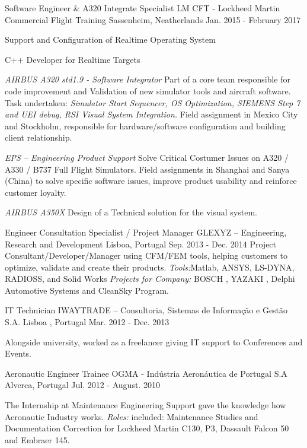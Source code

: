 \begin{cventries}
  \cventry
    {Software Engineer \& A320 Integrate Specialist}
    {LM CFT - Lockheed Martin Commercial Flight Training}
    {Sassenheim, Neatherlands}
    {Jan. 2015 - February 2017}
    {          
      \begin{cvitems}     
      \item{Support and Configuration of Realtime Operating System}
      \item{C++ Developer for Realtime Targets }
      \item {\textit{ AIRBUS A320 std1.9 - Software Integrator} Part of a core team responsible for code improvement and Validation of new simulator tools and aircraft software. Task undertaken: \textit{Simulator Start Sequencer, OS Optimization, SIEMENS Step 7 and  UEI debug, RSI Visual System Integration.} 
      Field assignment in Mexico City and Stockholm, responsible for hardware/software configuration and building client relationship.}
    \item {\textit{EPS – Engineering Product Support} Solve Critical Costumer  Issues on A320 / A330 / B737 Full Flight Simulators. Field assignments in Shanghai and Sanya (China) to  solve specific software issues, improve product usability and reinforce customer loyalty.}
       \item {\textit{AIRBUS A350X}  Design of a Technical solution for the visual system.}
       \end{cvitems}
    }


\cventry
    {Engineer Consultation Specialist / Project Manager}
    {GLEXYZ – Engineering, Research and Development}
    {Lisboa, Portugal}
    {Sep. 2013 - Dec. 2014}
    {
Project Consultant/Developer/Manager using CFM/FEM tools, helping customers to optimize, validate and create their products. \textit{Tools:}Matlab, ANSYS, LS-DYNA, RADIOSS, and Solid Works
\textit{Projects for Company:} BOSCH , YAZAKI , Delphi Automotive Systems and CleanSky Program.
    }
    
    
  \cventry
    {IT Technician}
    {IWAYTRADE – Consultoria, Sistemas de Informação e Gestão S.A.}
    {Lisboa , Portugal}
    {Mar. 2012 - Dec. 2013}
    {
      \begin{cvitems}
        \item {Alongside university, worked as a freelancer giving IT support to Conferences and Events.        }
      \end{cvitems} 
    }
    
  \cventry
    {Aeronautic Engineer Trainee}
    {OGMA - Indústria Aeronáutica de Portugal S.A}
    {Alverca, Portugal}
    {Jul. 2012 - August. 2010}
    {
      \begin{cvitems}
        \item {The Internship at Maintenance Engineering Support gave the knowledge how Aeronautic Industry works. \textit{Roles:} included: Maintenance Studies and Documentation Correction for Lockheed Martin C130, P3, Dassault Falcon 50 and Embraer 145.}
      \end{cvitems}
    }
\end{cventries}
